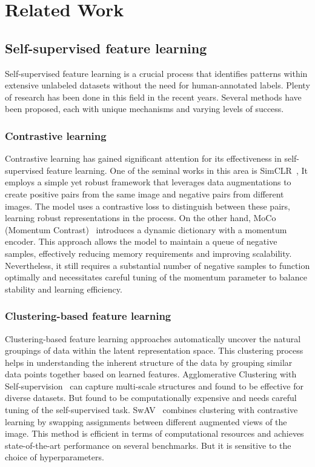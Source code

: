 \chapter{Related Work}\label{chap:relatedwork}
\section{Self-supervised feature learning}
Self-supervised feature learning is a crucial process that identifies patterns within extensive unlabeled datasets without the need for human-annotated labels. Plenty of research has been done in this field in the recent years. Several methods have been proposed, each with unique mechanisms and varying levels of success.

\subsection{Contrastive learning}
Contrastive learning has gained significant attention for its effectiveness in self-supervised feature learning. One of the seminal works in this area is SimCLR~\cite{chen2020simple}, It employs a simple yet robust framework that leverages data augmentations to create positive pairs from the same image and negative pairs from different images. The model uses a contrastive loss to distinguish between these pairs, learning robust representations in the process. On the other hand, MoCo (Momentum Contrast)~\cite{he2020momentum} introduces a dynamic dictionary with a momentum encoder. This approach allows the model to maintain a queue of negative samples, effectively reducing memory requirements and improving scalability. Nevertheless, it still requires a substantial number of negative samples to function optimally and necessitates careful tuning of the momentum parameter to balance stability and learning efficiency.

\subsection{Clustering-based feature learning}
Clustering-based feature learning approaches automatically uncover the natural groupings of data within the latent representation space. This clustering process helps in understanding the inherent structure of the data by grouping similar data points together based on learned features. Agglomerative Clustering with Self-supervision~\cite{asano2020selflabelling} can capture multi-scale structures and found to be effective for diverse datasets. But found to be computationally expensive and needs careful tuning of the self-supervised task. SwAV~\cite{caron2021unsupervised} combines clustering with contrastive learning by swapping assignments between different augmented views of the image. This method is efficient in terms of computational resources and achieves state-of-the-art performance on several benchmarks. But it is sensitive to the choice of hyperparameters.

